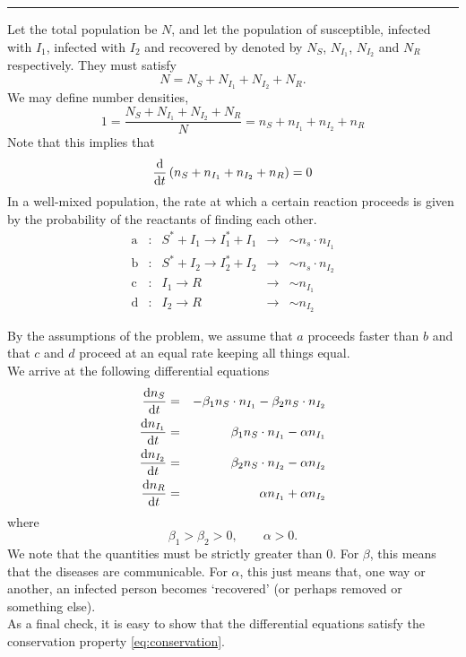 \documentclass[10pt,a4paper]{article}
\newcommand{\deri}[2]{\dfrac{\textnormal{d} #1 }{\textnormal{d} #2}}
\newcommand{\topic}{\vspace{-1mm} \noindent \rule{0.5\textwidth}{0.4pt}  \vspace{1mm}}
\begin{document}
\topic

Let the total population be $N$, and let the population of susceptible, infected with $I_1$, infected with $I_2$ and recovered by denoted by $N_S$, $N_{I_1}$, $N_{I_2}$ and $N_R$ respectively. They must satisfy
\begin{equation}
N = N_S + N_{I_1} + N_{I_2} + N_R.
\end{equation}
We may define number densities,
\begin{equation}
1 = \dfrac{N_S + N_{I_1} + N_{I_2} + N_R}{N} = n_S + n_{I_1} + n_{I_2} + n_R
\end{equation}
Note that this implies that
\begin{equation}
\deri{}{t} \left( n_S + n_{I_1} + n_{I_2} + n_R \right) = 0
\label{eq:conservation}
\end{equation}
In a well-mixed population, the rate at which a certain reaction proceeds is given by the probability of the reactants of finding each other.
\begin{equation}
\begin{array}{ccccc}
\textrm{a}&:& S^* + I_1 \to I_1^* + I_1 &\to& \sim n_s \cdot n_{I_1} \\
\textrm{b}&:& S^* + I_2 \to I_2^* + I_2 &\to& \sim n_s \cdot n_{I_2} \\
\textrm{c}&:& I_1 \to R &\to& \sim n_{I_1}\\
\textrm{d}&:& I_2 \to R & \to& \sim n_{I_2}
\end{array}
\end{equation}

By the assumptions of the problem, we assume that $a$ proceeds faster than $b$ and that $c$ and $d$ proceed at an equal rate keeping all things equal. \\

We arrive at the following differential equations
\begin{eqnarray}
\deri{n_S}{t} &=& - \beta_1 n_S \cdot n_{I_1} - \beta_2 n_S \cdot n_{I_2} \\
\deri{n_{I_1}}{t} &=& \beta_1 n_S \cdot n_{I_1} - \alpha n_{I_1} \\
\deri{n_{I_2}}{t} &=& \beta_2 n_S \cdot n_{I_2} - \alpha n_{I_2} \\
\deri{n_R}{t} &=& \alpha n_{I_1} + \alpha n_{I_2}
\end{eqnarray}
where
\begin{equation}
\beta_1 > \beta_2 > 0, \qquad \alpha > 0.
\end{equation}
We note that the quantities must be strictly greater than 0. For $\beta$, this means that the diseases are communicable. For $\alpha$, this just means that, one way or another, an infected person becomes `recovered' (or perhaps removed or something else). \\

As a final check, it is easy to show that the differential equations satisfy the conservation property \eqref{eq:conservation}.
\end{document}
